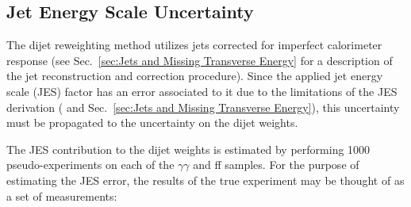 \documentclass[dissertation.tex]{subfiles}
\begin{document}



\subsection{Jet Energy Scale Uncertainty}

The dijet \pT reweighting method utilizes jets corrected for imperfect calorimeter response (see Sec.~\ref{sec:Jets and Missing Transverse Energy} for a description of the jet reconstruction and correction procedure).  Since the applied jet energy scale (JES) factor has an error associated to it due to the limitations of the JES derivation (\cite{CMS_JES_paper} and Sec.~\ref{sec:Jets and Missing Transverse Energy}), this uncertainty must be propagated to the uncertainty on the dijet \pT weights.

The JES contribution to the dijet \pT weights is estimated by performing 1000 pseudo-experiments on each of the $\gamma\gamma$ and ff samples.  For the purpose of estimating the JES error, the results of the true experiment may be thought of as a set of measurements:
\end{document}
